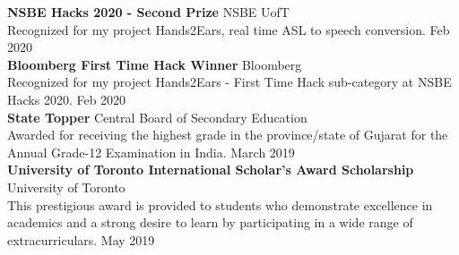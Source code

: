 \documentclass[a4paper]{article}
\begin{document}
\vspace*{2mm}
\textbf{NSBE Hacks 2020 - Second Prize} \hfill NSBE UofT\\
Recognized for my project Hands2Ears, real time ASL to speech conversion. \hfill Feb 2020\\
\vspace*{2mm}
\textbf{Bloomberg First Time Hack Winner} \hfill Bloomberg\\
Recognized for my project Hands2Ears - \textquotedbl{}First Time Hack\textquotedbl{} sub-category at NSBE Hacks 2020. \hfill Feb 2020\\
\vspace*{2mm}
\textbf{State Topper} \hfill Central Board of Secondary Education\\
Awarded for receiving the highest grade in the province/state of Gujarat for the Annual Grade-12
Examination in India. \hfill March 2019\\
\vspace*{2mm}
\textbf{University of Toronto International Scholar’s Award Scholarship} \hfill University of Toronto\\
This prestigious award is provided to students who demonstrate excellence in academics and a strong desire to learn by participating in a wide range of extracurriculars. \hfill May 2019\\
\end{document}
